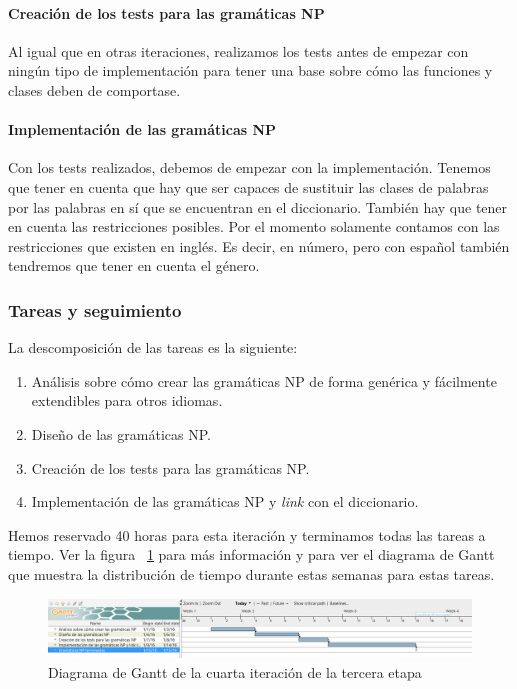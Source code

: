 \paragraph{Creación de los tests para las gramáticas NP} Al igual que en otras iteraciones, realizamos los tests antes de empezar con ningún tipo de implementación para tener una base sobre cómo las funciones y clases deben de comportase.

\paragraph{Implementación de las gramáticas NP} Con los tests realizados, debemos de empezar con la implementación. Tenemos que tener en cuenta que hay que ser capaces de sustituir las clases de palabras por las palabras en sí que se encuentran en el diccionario. También hay que tener en cuenta las restricciones posibles. Por el momento solamente contamos con las restricciones que existen en inglés. Es decir, en número, pero con español también tendremos que tener en cuenta el género.

\subsubsection{Tareas y seguimiento}

La descomposición de las tareas es la siguiente:

\begin{enumerate}[label=\bfseries WBS 4.\arabic*]
  \item Análisis sobre cómo crear las gramáticas NP de forma genérica y fácilmente extendibles para otros idiomas.
  \item Diseño de las gramáticas NP.
  \item Creación de los tests para las gramáticas NP.
  \item Implementación de las gramáticas NP y \textit{link} con el diccionario.
\end{enumerate}

Hemos reservado 40 horas para esta iteración y terminamos todas las tareas a tiempo. Ver la figura ~\ref{fig:sec3it4} para más información y para ver el diagrama de Gantt que muestra la distribución de tiempo durante estas semanas para estas tareas.

\begin{figure}
    \includegraphics[width=\textwidth,height=\textheight,keepaspectratio]{./img/sec3it4.png}
  \caption{Diagrama de Gantt de la cuarta iteración de la tercera etapa}
  \label{fig:sec3it4}
\end{figure}

